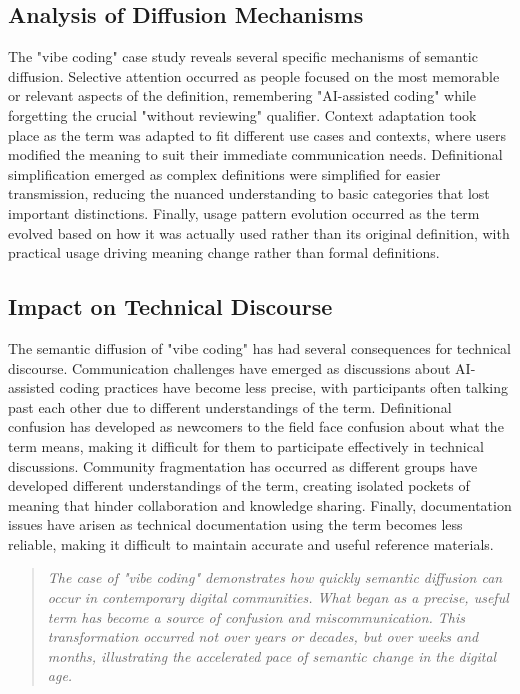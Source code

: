 \documentclass[11pt]{article}
\begin{document}
\subsection{Analysis of Diffusion Mechanisms}

The "vibe coding" case study reveals several specific mechanisms of semantic diffusion. Selective attention occurred as people focused on the most memorable or relevant aspects of the definition, remembering "AI-assisted coding" while forgetting the crucial "without reviewing" qualifier. Context adaptation took place as the term was adapted to fit different use cases and contexts, where users modified the meaning to suit their immediate communication needs. Definitional simplification emerged as complex definitions were simplified for easier transmission, reducing the nuanced understanding to basic categories that lost important distinctions. Finally, usage pattern evolution occurred as the term evolved based on how it was actually used rather than its original definition, with practical usage driving meaning change rather than formal definitions.

\subsection{Impact on Technical Discourse}

The semantic diffusion of "vibe coding" has had several consequences for technical discourse. Communication challenges have emerged as discussions about AI-assisted coding practices have become less precise, with participants often talking past each other due to different understandings of the term. Definitional confusion has developed as newcomers to the field face confusion about what the term means, making it difficult for them to participate effectively in technical discussions. Community fragmentation has occurred as different groups have developed different understandings of the term, creating isolated pockets of meaning that hinder collaboration and knowledge sharing. Finally, documentation issues have arisen as technical documentation using the term becomes less reliable, making it difficult to maintain accurate and useful reference materials.

\begin{quote}
\emph{The case of "vibe coding" demonstrates how quickly semantic diffusion can occur in contemporary digital communities. What began as a precise, useful term has become a source of confusion and miscommunication. This transformation occurred not over years or decades, but over weeks and months, illustrating the accelerated pace of semantic change in the digital age.}
\end{quote}
\end{document}
